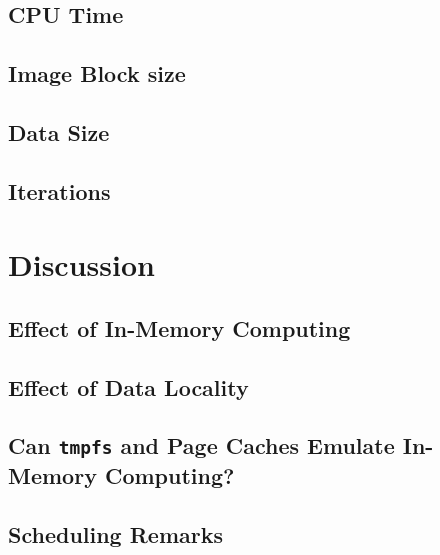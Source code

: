 \documentclass{IEEEtran}
\begin{document}
\subsection{CPU Time}
%



\subsection{Image Block size}

\subsection{Data Size}

\subsection{Iterations}


\section{Discussion} %
\label{sec:discussion}
\subsection{Effect of In-Memory Computing}

\subsection{Effect of Data Locality}


\subsection{Can \texttt{tmpfs} and Page Caches Emulate In-Memory Computing?}


\subsection{Scheduling Remarks}
\end{document}
